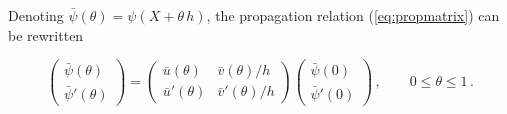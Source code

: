 Denoting $\bar{\psi}(\theta) =\psi(X+\theta\,h)$, the propagation relation (\ref{eq:propmatrix}) can be rewritten

\begin{equation}
    \begin{pmatrix}\bar{\psi}(\theta)\\ \bar{\psi}'(\theta)\end{pmatrix}
    = \begin{pmatrix} \bar{u}(\theta) & \bar{v}(\theta)/h \\ \bar{u}'(\theta) & \bar{v}'(\theta)/h \end{pmatrix} \begin{pmatrix} \bar{\psi}(0) \\ \bar{\psi}'(0) \end{pmatrix} \,, \qquad %
    0 \leq \theta \leq 1 \,. \label{eq:propmatrix2}
\end{equation}


